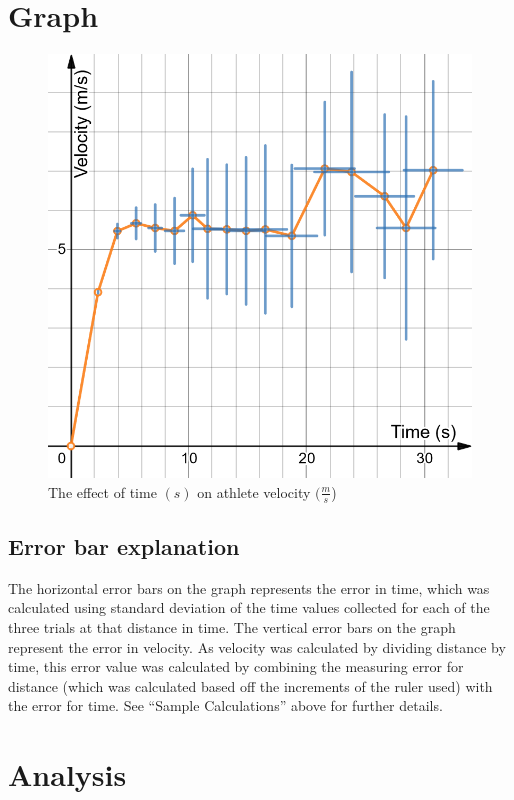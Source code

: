 \documentclass[index]{subfiles}
\begin{document}
\section{Graph}

\begin{figure}[H]
    \centering
    \caption{The effect of time \((s)\) on athlete velocity \((\frac{m}{s}\))}
    \includegraphics[scale=0.3]{pics/velocity-time.png}
\end{figure}


\subsection{Error bar explanation}

The horizontal error bars on the graph represents the error in time, which was calculated using standard deviation of the time values collected for each of the three trials at that distance in time. The vertical error bars on the graph represent the error in velocity. As velocity was calculated by dividing distance by time, this error value was calculated by combining the measuring error for distance (which was calculated based off the increments of the ruler used) with the error for time. See ``Sample Calculations'' above for further details.

\section{Analysis}
\end{document}
